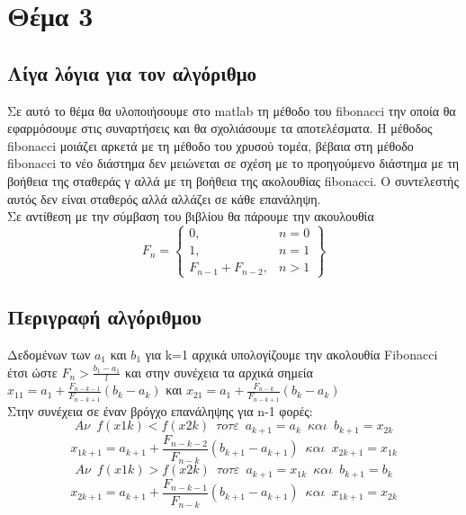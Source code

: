 \documentclass{article}
\begin{document}
 \section*{Θέμα 3}
 \subsection*{Λίγα λόγια για τον αλγόριθμο} 
Σε αυτό το θέμα θα υλοποιήσουμε στο matlab τη μέθοδο του fibonacci την οποία θα εφαρμόσουμε στις συναρτήσεις και θα σχολιάσουμε τα αποτελέσματα.
 Η μέθοδος fibonacci μοιάζει αρκετά με τη μέθοδο του χρυσού τομέα, βέβαια στη μέθοδο
fibonacci το νέο διάστημα δεν μειώνεται σε σχέση με το προηγούμενο διάστημα με τη βοήθεια
της σταθεράς γ αλλά με τη βοήθεια της ακολουθίας fibonacci. Ο συντελεστής αυτός δεν είναι
σταθερός αλλά αλλάζει σε κάθε επανάληψη. \\
Σε αντίθεση με την σύμβαση του βιβλίου θα πάρουμε την ακουλουθία 
 \[
    F_n = \left\{\begin{array}{lr}
        0, & n=0\\
        1, & n=1\\
        F_{n-1} + F_{n-2}, & n > 1
        \end{array}\right\} 
  \]
\subsection*{Περιγραφή αλγόριθμου}
Δεδομένων των $a_1$ και $b_1$ για k=1 αρχικά υπολογίζουμε την ακολουθία Fibonacci έτσι ώστε $F_n > \frac{b_1 - a_1}{l}$ και στην συνέχεια τα αρχικά σημεία\\ $\boxed{x_{11} = a_1 + \frac{F_{n-k-1}}{F_{n-k+1}}(b_k-a_k)}$ και $\boxed{x_{21} = a_1 + \frac{F_{n-k}}{F_{n-k+1}}(b_k-a_k)}$ \\
Στην συνέχεια σε έναν βρόγχο επανάληψης για n-1 φορές: \\

\begin{equation*}
Αν \enspace f(x1k)< f(x2k) \enspace τoτε \enspace a_{k+1} = a_k \enspace και \enspace b_{k+1} = x_{2k}
\end{equation*}
\begin{equation*}
x_{1k+1} = a_{k+1} + \frac{F_{n-k-2}}{F_{n-k}}(b_{k+1}-a_{k+1}) \enspace και \enspace  x_{2k+1} = x_{1k}
\end{equation*}
 \begin{equation*}
Αν \enspace f(x1k)> f(x2k) \enspace τoτε \enspace a_{k+1} = x_{1k} \enspace και \enspace b_{k+1} = b_{k}
\end{equation*}
\begin{equation*}
x_{2k+1} = a_{k+1} + \frac{F_{n-k-1}}{F_{n-k}}(b_{k+1}-a_{k+1}) \enspace και \enspace  x_{1k+1} = x_{2k}
\end{equation*}
\end{document}
